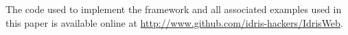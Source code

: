 
The code used to implement the framework and all associated examples used in
this paper is available online at
\url{http://www.github.com/idris-hackers/IdrisWeb}.

